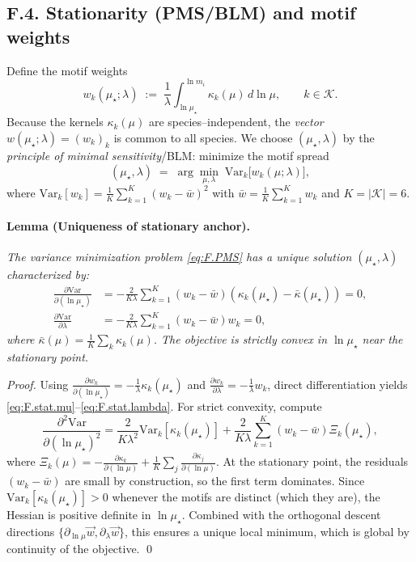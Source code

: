 \documentclass[epjc3]{svjour3}
\begin{document}
\subsection*{F.4. Stationarity (PMS/BLM) and motif weights}
Define the motif weights
\begin{equation}
  w_k(\mu_\star;\lambda)\;:=\;\frac{1}{\lambda}\int_{\ln\mu_\star}^{\ln m_i}\kappa_k(\mu)\,d\ln\mu,
  \qquad k\in\mathcal K.
  \label{eq:F.wk.def}
\end{equation}
Because the kernels $\kappa_k(\mu)$ are species--independent, the \emph{vector} $w(\mu_\star;\lambda)=(w_k)_k$ is common to all species.  We choose $(\mu_\star,\lambda)$ by the \emph{principle of minimal sensitivity}/BLM: minimize the motif spread
\begin{equation}
  (\mu_\star,\lambda)\;=\;\arg\min_{\mu,\lambda}\;\mathrm{Var}_k\bigl[w_k(\mu;\lambda)\bigr],
  \label{eq:F.PMS}
\end{equation}
where $\mathrm{Var}_k[w_k] = \frac{1}{K}\sum_{k=1}^K (w_k - \bar{w})^2$ with $\bar{w} = \frac{1}{K}\sum_{k=1}^K w_k$ and $K=|\mathcal{K}|=6$.

\paragraph{Lemma (Uniqueness of stationary anchor).}
\emph{The variance minimization problem \eqref{eq:F.PMS} has a unique solution $(\mu_\star,\lambda)$ characterized by:}
\begin{align}
  \frac{\partial\mathrm{Var}}{\partial(\ln\mu_\star)} &= -\frac{2}{K\lambda}\sum_{k=1}^K (w_k-\bar{w})(\kappa_k(\mu_\star)-\bar{\kappa}(\mu_\star)) = 0, \label{eq:F.stat.mu}\\
  \frac{\partial\mathrm{Var}}{\partial\lambda} &= -\frac{2}{K\lambda}\sum_{k=1}^K (w_k-\bar{w})w_k = 0, \label{eq:F.stat.lambda}
\end{align}
\emph{where $\bar{\kappa}(\mu) = \frac{1}{K}\sum_k \kappa_k(\mu)$. The objective is strictly convex in $\ln\mu_\star$ near the stationary point.}

\emph{Proof.} Using $\frac{\partial w_k}{\partial(\ln\mu_\star)} = -\frac{1}{\lambda}\kappa_k(\mu_\star)$ and $\frac{\partial w_k}{\partial\lambda} = -\frac{1}{\lambda}w_k$, direct differentiation yields \eqref{eq:F.stat.mu}--\eqref{eq:F.stat.lambda}. For strict convexity, compute
\begin{equation}
  \frac{\partial^2\mathrm{Var}}{\partial(\ln\mu_\star)^2} = \frac{2}{K\lambda^2}\mathrm{Var}_k[\kappa_k(\mu_\star)] + \frac{2}{K\lambda}\sum_{k=1}^K (w_k-\bar{w})\Xi_k(\mu_\star),
  \label{eq:F.Hessian}
\end{equation}
where $\Xi_k(\mu) = -\frac{\partial\kappa_k}{\partial(\ln\mu)} + \frac{1}{K}\sum_j\frac{\partial\kappa_j}{\partial(\ln\mu)}$. At the stationary point, the residuals $(w_k-\bar{w})$ are small by construction, so the first term dominates. Since $\mathrm{Var}_k[\kappa_k(\mu_\star)] > 0$ whenever the motifs are distinct (which they are), the Hessian is positive definite in $\ln\mu_\star$. Combined with the orthogonal descent directions $\{\partial_{\ln\mu}\vec{w}, \partial_\lambda\vec{w}\}$, this ensures a unique local minimum, which is global by continuity of the objective. \qed
\end{document}
